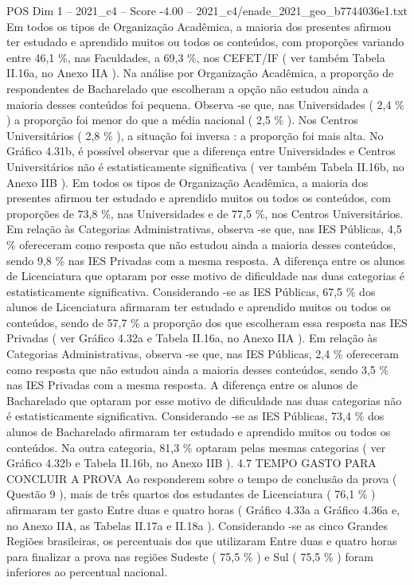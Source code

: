 \begin{textsample}{POS Dim 1 – 2021\_c4 – Score -4.00 – 2021\_c4/enade\_2021\_geo\_b7744036e1.txt}
Em todos os tipos de Organização Acadêmica, a maioria dos presentes afirmou ter estudado e aprendido muitos ou todos os conteúdos, com proporções variando entre 46,1 \%, nas Faculdades, a 69,3 \%, nos CEFET/IF ( ver também Tabela II.16a, no Anexo IIA ).
Na análise por Organização Acadêmica, a proporção de respondentes de Bacharelado que escolheram a opção não estudou ainda a maioria desses conteúdos foi pequena.
Observa -se que, nas Universidades ( 2,4 \% ) a proporção foi menor do que a média nacional ( 2,5 \% ).
Nos Centros Universitários ( 2,8 \% ), a situação foi inversa : a proporção foi mais alta.
No Gráfico 4.31b, é possível observar que a diferença entre Universidades e Centros Universitários não é estatisticamente significativa ( ver também Tabela II.16b, no Anexo IIB ).
Em todos os tipos de Organização Acadêmica, a maioria dos presentes afirmou ter estudado e aprendido muitos ou todos os conteúdos, com proporções de 73,8 \%, nas Universidades e de 77,5 \%, nos Centros Universitários.
Em relação às Categorias Administrativas, observa -se que, nas IES Públicas, 4,5 \% ofereceram como resposta que não estudou ainda a maioria desses conteúdos, sendo 9,8 \% nas IES Privadas com a mesma resposta.
A diferença entre os alunos de Licenciatura que optaram por esse motivo de dificuldade nas duas categorias é estatisticamente significativa.
Considerando -se as IES Públicas, 67,5 \% dos alunos de Licenciatura afirmaram ter estudado e aprendido muitos ou todos os conteúdos, sendo de 57,7 \% a proporção dos que escolheram essa resposta nas IES Privadas ( ver Gráfico 4.32a e Tabela II.16a, no Anexo IIA ).
Em relação às Categorias Administrativas, observa -se que, nas IES Públicas, 2,4 \% ofereceram como resposta que não estudou ainda a maioria desses conteúdos, sendo 3,5 \% nas IES Privadas com a mesma resposta.
A diferença entre os alunos de Bacharelado que optaram por esse motivo de dificuldade nas duas categorias não é estatisticamente significativa.
Considerando -se as IES Públicas, 73,4 \% dos alunos de Bacharelado afirmaram ter estudado e aprendido muitos ou todos os conteúdos.
Na outra categoria, 81,3 \% optaram pelas mesmas categorias ( ver Gráfico 4.32b e Tabela II.16b, no Anexo IIB ). 4.7 TEMPO GASTO PARA CONCLUIR A PROVA Ao responderem sobre o tempo de conclusão da prova ( Questão 9 ), mais de três quartos dos estudantes de Licenciatura ( 76,1 \% ) afirmaram ter gasto Entre duas e quatro horas ( Gráfico 4.33a a Gráfico 4.36a e, no Anexo IIA, as Tabelas II.17a e II.18a ).
Considerando -se as cinco Grandes Regiões brasileiras, os percentuais dos que utilizaram Entre duas e quatro horas para finalizar a prova nas regiões Sudeste ( 75,5 \% ) e Sul ( 75,5 \% ) foram inferiores ao percentual nacional.

\end{textsample}
